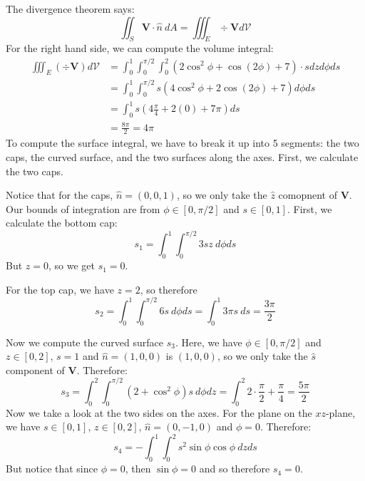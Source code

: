 \documentclass[10pt]{article}
\begin{document}
\begin{enumerate}[label= (\alph*), resume]
\begin{center}
        \end{center}
        \begin{solution}
            The divergence theorem says:
            \[ \iint_S \mathbf V \cdot \hat n \ dA = \iiint_E \div \mathbf V d\mathcal V\]
            For the right hand side, we can compute the volume integral:
            \begin{align*}
                \iiint_E (\div \mathbf V) d\mathcal V &= \int_0^1 \int_0^{\pi/2} \int_0^2 \left(2\cos^2 \phi + \cos(2\phi) + 7\right)\cdot s dz d\phi ds\\
                &= \int_0^1 \int_0^{\pi/2} s(4\cos^2 \phi + 2\cos(2\phi) + 7) d\phi ds\\
                &=  \int_0^1 s(4\frac{\pi}{4} + 2(0) + 7\pi) ds\\
                &= \frac{8\pi}{2} = 4\pi
            \end{align*}
            To compute the surface integral, we have to break it up into 5 segments: the two caps, the curved surface, and the two surfaces along the axes. First, we calculate the two caps. 

            Notice that for the caps, $\hat n = (0, 0, 1)$, so we only take the $\hat z$ comopnent of $\mathbf V$. Our bounds of integration are from $\phi \in [0, \pi/2]$ and $s \in [0, 1]$. First, we calculate the bottom cap:
            \[ s_1 = \int_0^1 \int_0^{\pi/2} 3sz \ d\phi ds\]
            But $z = 0$, so we get $s_1 = 0$.

            For the top cap, we have $z = 2$, so therefore
            \[ s_2 = \int_0^1 \int_0^{\pi/2} 6s \ d\phi ds = \int_0^1 3\pi s \ ds = \frac{3\pi}{2}\]

            Now we compute the curved surface $s_3$. Here, we have $\phi \in [0, \pi/2]$ and $z \in [0, 2]$, $s = 1$ and $\hat n = (1, 0, 0)$ is $(1, 0, 0)$, so we only take the $\hat s$ component of $\mathbf V$. Therefore:
            \[ s_3 = \int_0^2 \int_0^{\pi/2}(2 + \cos^2 \phi)s \ d\phi dz = \int_0^2 2 \cdot \frac{\pi}{2} + \frac{\pi}{4} = \frac{5\pi}{2}\]
            Now we take a look at the two sides on the axes. For the plane on the $xz$-plane, we have $s \in [0, 1]$, $z \in [0, 2]$, $\hat n = (0, -1, 0)$ and $\phi = 0$. Therefore:
            \[ s_4 = -\int_0^1 \int_0^2 s^2 \sin \phi \cos \phi \ dz ds\]
            But notice that since $\phi = 0$, then $\sin \phi = 0$ and so therefore $s_4 = 0$. 


\end{solution}
\end{enumerate}
\end{document}
